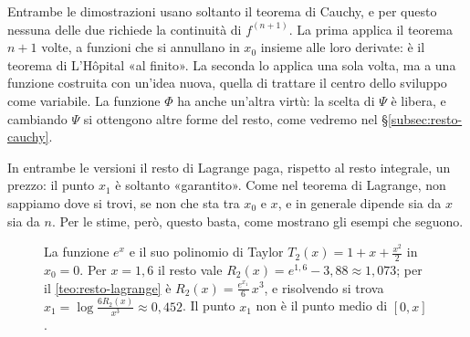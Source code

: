 \begin{osservazione}\label{oss:confronto-resto-lagrange}
Entrambe le dimostrazioni usano soltanto il teorema di Cauchy, e per questo nessuna
delle due richiede la continuità di $f^{(n+1)}$. La prima applica il teorema $n+1$ volte,
a funzioni che si annullano in $x_{0}$ insieme alle loro derivate: è il teorema di
L'Hôpital «al finito». La seconda lo applica una sola volta, ma a una funzione costruita
con un'idea nuova, quella di trattare il centro dello sviluppo come variabile. La
funzione $\Phi$ ha anche un'altra virtù: la scelta di $\Psi$ è libera, e cambiando $\Psi$ si
ottengono altre forme del resto, come vedremo nel \S\ref{subsec:resto-cauchy}.
\end{osservazione}

In entrambe le versioni il resto di Lagrange paga, rispetto al resto integrale, un prezzo:
il punto $x_{1}$ è soltanto «garantito». Come nel teorema di Lagrange, non sappiamo dove si
trovi, se non che sta tra $x_{0}$ e $x$, e in generale dipende sia da $x$ sia da $n$. Per le stime, però, questo basta, come mostrano gli
esempi che seguono.

\begin{figure}[htb]
\centering
{}
\caption{La funzione $e^{x}$ e il suo polinomio di Taylor $T_{2}(x)=1+x+\frac{x^{2}}2$ in $x_{0}=0$.
Per $x=1{,}6$ il resto vale $R_{2}(x)=e^{1{,}6}-3{,}88\approx1{,}073$; per il
\cref{teo:resto-lagrange} è $R_{2}(x)=\frac{e^{x_{1}}}{6}\,x^{3}$, e risolvendo si trova
$x_{1}=\log\frac{6R_{2}(x)}{x^{3}}\approx0{,}452$. Il punto $x_{1}$ non è il punto medio di
$[0,x]$.}
\label{fig:resto-lagrange}
\end{figure}

